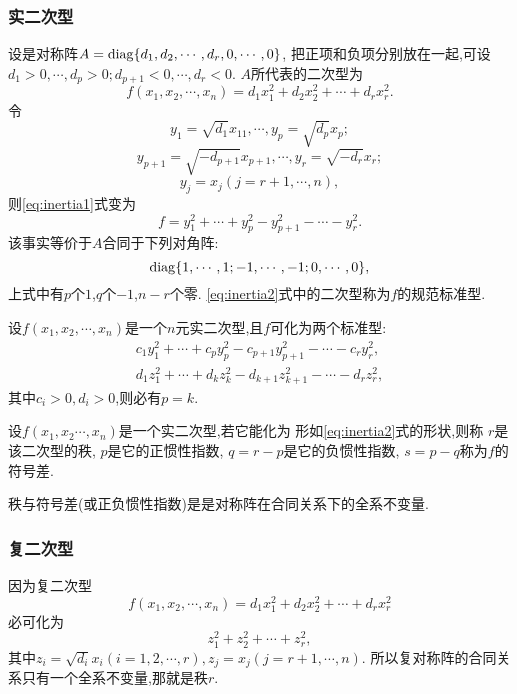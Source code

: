 \subsubsection{实二次型}

设是对称阵$A=\operatorname{diag}\{d_1,d_2,\cdots,d_r,0,\cdots,0\}$,
把正项和负项分别放在一起,可设
$d_1>0,\cdots,d_p>0;d_{p+1}<0,\cdots,d_r<0.$
$A$所代表的二次型为
\begin{equation}\label{eq:inertia1}
  f(x_1,x_2,\cdots,x_n)=d_1x_1^2+d_2x_2^2+\cdots+d_rx_r^2.
\end{equation}
令
\[ y_1=\sqrt{d_1}x_11,\cdots,y_p=\sqrt{d_p}x_p; \]
\[ y_{p+1}=\sqrt{-d_{p+1}}x_{p+1},\cdots,y_r=\sqrt{-d_r}x_r; \]
\[ y_j=x_j(j=r+1,\cdots,n), \]
则\eqref{eq:inertia1}式变为
\begin{equation}\label{eq:inertia2}
  f=y_1^2+\cdots+y_p^2-y_{p+1}^2-\cdots-y_r^2.
\end{equation}
该事实等价于$A$合同于下列对角阵:
\begin{equation}\label{eq:inertia3}
  \operatorname{diag}\{1,\cdots,1;-1,\cdots,-1;0,\cdots,0\},
\end{equation}
上式中有$p$个$1$,$q$个$-1$,$n-r$个零.
\eqref{eq:inertia2}式中的二次型称为$f$的{\heiti 规范标准型}.
\begin{theorem}
  设$f(x_1,x_2,\cdots,x_n)$是一个$n$元实二次型,且$f$可化为两个标准型:
  \begin{align*}
    &c_1y_1^2+\cdots+c_py_p^2-c_{p+1}y_{p+1}^2-\cdots-c_ry_r^2,&\\
    &d_1z_1^2+\cdots+d_kz_k^2-d_{k+1}z_{k+1}^2-\cdots-d_rz_r^2,&
  \end{align*}
  其中$c_i>0, d_i>0$,则必有$p=k$.
\end{theorem}

\begin{definition}
  设$f(x_1,x_2\cdots,x_n)$是一个实二次型,若它能化为
  形如\eqref{eq:inertia2}式的形状,则称
  $r$是该二次型的秩, $p$是它的正惯性指数,
   $q=r-p$是它的负惯性指数, $s=p-q$称为$f$的符号差.
 \end{definition}

 \begin{theorem}
   秩与符号差(或正负惯性指数)是是对称阵在合同关系下的全系不变量.
 \end{theorem}

\subsubsection{复二次型}
因为复二次型
\[ f(x_1,x_2,\cdots,x_n)=d_1x_1^2+d_2x_2^2+\cdots+d_rx_r^2 \]
必可化为
\[ z_1^2+z_2^2+\cdots+z_r^2, \]
其中$z_i=\sqrt{d_i}x_i (i=1,2,\cdots,r), z_j=x_j (j=r+1,\cdots,n)$.
所以复对称阵的合同关系只有一个全系不变量,那就是秩$r$.

